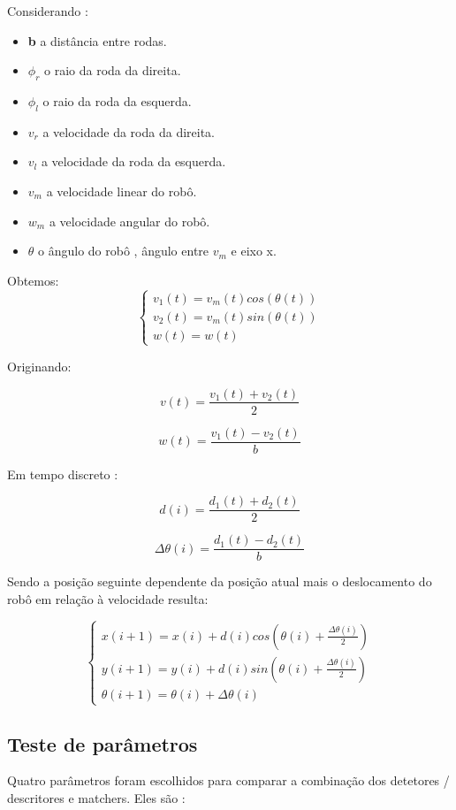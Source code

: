 Considerando : 
\begin{itemize}
	\item \textbf{b} a distância entre rodas.
	\item \textbf{$\phi_r$} o raio da roda da direita.
	\item \textbf{$\phi_l$} o raio da roda da esquerda.
	\item \textbf{$v_r$} a velocidade da roda da direita.
	\item \textbf{$v_l$} a velocidade da roda da esquerda.
	\item \textbf{$v_m$} a velocidade linear do robô.
	\item \textbf{$w_m$} a velocidade angular do robô.
	\item $\textbf{$\theta$}$ o ângulo do robô , ângulo entre $v_m$ e eixo x.
\end{itemize}

Obtemos:
\[ \left\{\begin{array}{ccc}
	v_1(t) = v_m(t) cos( \theta(t))\\ 
	v_2(t) = v_m(t) sin( \theta(t))\\ 
	w(t) = w(t)
\end{array}\right. \]

Originando: 

\[ v(t) = \frac{v_1(t)+v_2(t)}{2} \]

\[  w(t) = \frac{v_1(t)-v_2(t)}{b} \]

Em tempo discreto :

\[ d(i) = \frac{d_1(t)+d_2(t)}{2} \]

\[ \Delta \theta (i) = \frac{d_1(t)-d_2(t)}{b} \]

Sendo a posição seguinte dependente da posição atual mais o deslocamento do robô em relação à velocidade resulta:

\[ \left\{\begin{array}{ccc}
x(i+1) = x(i) + d(i) cos( \theta(i) + \frac{\Delta \theta(i)}{2})\\ 
y(i+1) = y(i) + d(i) sin( \theta(i) + \frac{\Delta \theta(i)}{2})\\ 
\theta (i+1) = \theta (i) + \Delta \theta (i)
\end{array}\right. \]



\subsection{Teste de parâmetros}

Quatro parâmetros foram escolhidos para comparar a combinação dos detetores / descritores e matchers. Eles são :

